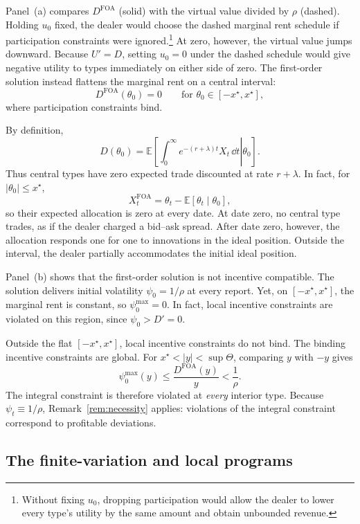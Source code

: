 \documentclass[12pt]{article}
\newcommand{\E}{\mathbb{E}}
\begin{document}
Panel~(a) compares \(D^{\mathrm{FOA}}\) (solid) with the virtual value
divided by \(\rho\) (dashed). Holding \(u_0\) fixed, the dealer would
choose the dashed marginal rent schedule if participation constraints were
ignored.\footnote{Without fixing \(u_0\), dropping participation would
allow the dealer to lower every type's utility by the same amount and
obtain unbounded revenue.}
At zero, however, the virtual value jumps downward. Because \(U'=D\),
setting \(u_0=0\) under the dashed schedule would give negative utility
to types immediately on either side of zero. The first-order solution
instead flattens the marginal rent on a central interval:
\[
  D^{\mathrm{FOA}}(\theta_0)=0
  \qquad\text{for }\theta_0\in[-x^\star,x^\star],
\]
where participation constraints bind.

By definition,
\[
  D(\theta_0)
  =
  \E\left[\left.
    \int_0^\infty e^{-(r+\lambda)t}X_t\,\dd t
  \right|\theta_0\right].
\]
Thus central types have zero expected trade discounted at rate
\(r+\lambda\). In fact, for
\(|\theta_0|\leq x^\star\),
\[
  X_t^{\mathrm{FOA}}
  =
  \theta_t-\E[\theta_t\mid\theta_0],
\]
so their expected allocation is zero at every date. At date zero, no
central type trades, as if the dealer charged a bid--ask spread. After date zero, however,
the allocation responds one for one to innovations in the ideal
position. Outside the interval, the dealer partially accommodates the
initial ideal position.

Panel~(b) shows that the first-order solution is not incentive compatible. The solution delivers
initial volatility \(\psi_0=1/\rho\) at every report. Yet, on $[-x^\star,x^\star]$,
the marginal rent is constant, so \(\psi_0^{\max}=0\). In fact, local incentive constraints are violated on this region, since $\psi_0>D'=0$.

Outside the flat $[-x^\star,x^\star]$, local incentive constraints do not bind. The binding incentive constraints are global. For
\(x^\star<|y|<\sup\Theta\), comparing \(y\) with \(-y\) gives
\[
  \psi_0^{\max}(y)
  \leq
  \frac{D^{\mathrm{FOA}}(y)}{y}
  <\frac1\rho.
\]
The integral constraint is therefore violated at \emph{every} interior type.  Because
\(\psi_t\equiv1/\rho\), Remark~\ref{rem:necessity} applies:
violations of the integral constraint correspond to profitable deviations.

\subsection{The finite-variation and local programs}
\end{document}
